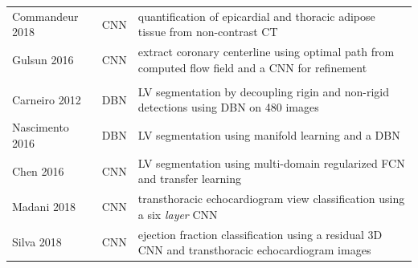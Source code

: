\documentclass[journal]{IEEEtran}
\begin{document}
\begin{table}[!t]
\begin{minipage}{\textwidth}
\begin{tabularx}{\textwidth}{l c l}
			Commandeur 2018\cite{commandeur2018deep}     & CNN             & quantification of epicardial and thoracic adipose tissue from non-contrast CT                                                                                                                                                    \\
			Gulsun 2016\cite{gulsun2016coronary}         & CNN             & extract coronary centerline using optimal path from computed flow field and a CNN for refinement                                                                                                                                 \\
			\midrule
			\multicolumn{3}{l}{\thead{Echocardiography}}                                                                                                                                                                                                                                                      \\
			\midrule
			Carneiro 2012\cite{carneiro2012segmentation} & DBN             & LV segmentation by decoupling rigin and non-rigid detections using DBN on 480 images                                                                                                                                             \\
			Nascimento 2016\cite{nascimento2016multi}    & DBN             & LV segmentation using manifold learning and a DBN                                                                                                                                                                                \\
			Chen 2016\cite{chen2016iterative}            & CNN             & LV segmentation using multi-domain regularized FCN and transfer learning                                                                                                                                                         \\
			Madani 2018\cite{madani2018fast}             & CNN             & transthoracic echocardiogram view classification using a six \textit{layer} CNN                                                                                                                                                  \\
			Silva 2018\cite{silva2018ejection}           & CNN             & ejection fraction classification using a residual 3D CNN and transthoracic echocardiogram images                                                                                                                                 \\

\end{tabularx}
\end{minipage}
\end{table}
\end{document}
